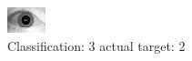 \begin{figure}[h!]
\begin{center}
\includegraphics[width=0.60\columnwidth]{figures/ID1727_class_3_target_2.png}
\end{center}
\caption{ Classification: 3 actual target: 2}
\label{fig:ID1727_class_3_target_2}
\end{figure}
